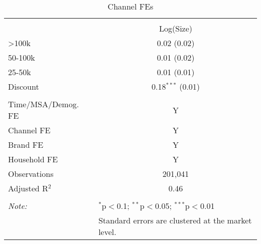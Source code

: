 
\begin{table}[!htbp] \centering 
  \caption{Channel FEs} 
  \label{tab:tpFEs} 
\begin{tabular}{@{\extracolsep{5pt}}lc} 
\\[-1.8ex]\hline 
\hline \\[-1.8ex] 
 & Log(Size) \\ 
 >100k & 0.02 (0.02) \\ 
  50-100k & 0.01 (0.02) \\ 
  25-50k & 0.01 (0.01) \\ 
  Discount & 0.18$^{***}$ (0.01) \\ 
 \hline \\[-1.8ex] 
Time/MSA/Demog. FE & Y \\ 
Channel FE & Y \\ 
Brand FE & Y \\ 
Household FE & Y \\ 
Observations & 201,041 \\ 
Adjusted R$^{2}$ & 0.46 \\ 
\hline 
\hline \\[-1.8ex] 
\textit{Note:}  & \multicolumn{1}{l}{$^{*}$p$<$0.1; $^{**}$p$<$0.05; $^{***}$p$<$0.01} \\ 
 & \multicolumn{1}{l}{Standard errors are clustered at the market level.} \\ 
\end{tabular} 
\end{table} 
